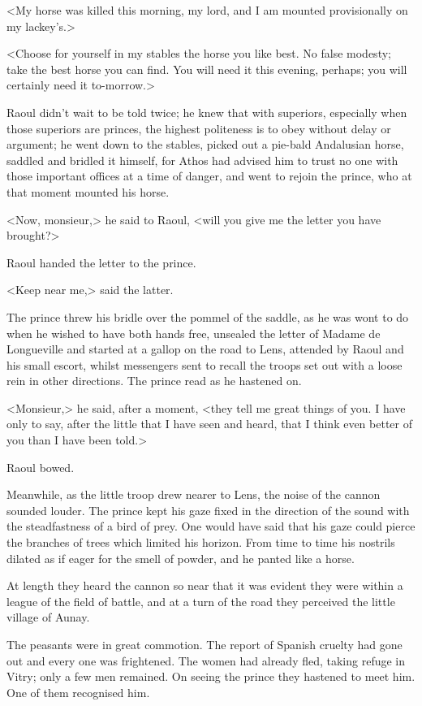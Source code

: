<My horse was killed this morning, my lord, and I am mounted provisionally on my lackey's.>

<Choose for yourself in my stables the horse you like best. No false modesty; take the best horse you can find. You will need it this evening, perhaps; you will certainly need it to-morrow.>

Raoul didn't wait to be told twice; he knew that with superiors, especially when those superiors are princes, the highest politeness is to obey without delay or argument; he went down to the stables, picked out a pie-bald Andalusian horse, saddled and bridled it himself, for Athos had advised him to trust no one with those important offices at a time of danger, and went to rejoin the prince, who at that moment mounted his horse.

<Now, monsieur,> he said to Raoul, <will you give me the letter you have brought?>

Raoul handed the letter to the prince.

<Keep near me,> said the latter.

The prince threw his bridle over the pommel of the saddle, as he was wont to do when he wished to have both hands free, unsealed the letter of Madame de Longueville and started at a gallop on the road to Lens, attended by Raoul and his small escort, whilst messengers sent to recall the troops set out with a loose rein in other directions. The prince read as he hastened on.

<Monsieur,> he said, after a moment, <they tell me great things of you. I have only to say, after the little that I have seen and heard, that I think even better of you than I have been told.>

Raoul bowed.

Meanwhile, as the little troop drew nearer to Lens, the noise of the cannon sounded louder. The prince kept his gaze fixed in the direction of the sound with the steadfastness of a bird of prey. One would have said that his gaze could pierce the branches of trees which limited his horizon. From time to time his nostrils dilated as if eager for the smell of powder, and he panted like a horse.

At length they heard the cannon so near that it was evident they were within a league of the field of battle, and at a turn of the road they perceived the little village of Aunay.

The peasants were in great commotion. The report of Spanish cruelty had gone out and every one was frightened. The women had already fled, taking refuge in Vitry; only a few men remained. On seeing the prince they hastened to meet him. One of them recognised him.

